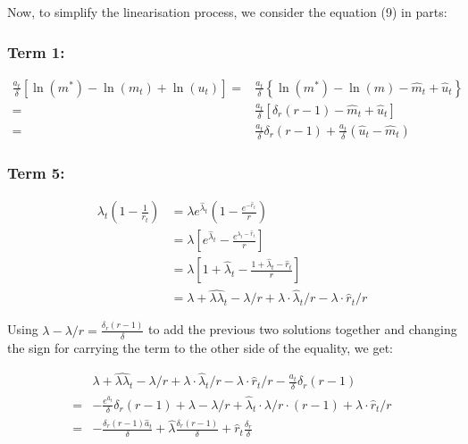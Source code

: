 \documentclass[11pt,preprint, authoryear]{elsarticle}
\numberwithin{equation}{section}
\numberwithin{figure}{section}
\numberwithin{table}{section}
\begin{document}
Now, to simplify the linearisation process, we consider the equation (9)
in parts:

\hypertarget{term-1-1}{%
\subsubsection{Term 1:}\label{term-1-1}}

\[\begin{aligned}
\frac{a_{t}}{\delta}\left[\ln \left(m^{*}\right)-\ln \left(m_{t}\right)+\ln \left(u_{t}\right)\right]
= &\frac{a_{t}}{\delta}\left\{\ln \left(m^{*}\right)-\ln (m)-\hat{m}_{t}+\hat{u}_{t}\right\} \\
= &\frac{a_{t}}{\delta}\left[\delta_{r}(r-1)-\hat{m}_{t}+\hat{u}_{t}\right] \\
= &\frac{a_{t}}{\delta}\delta_{r}(r-1) + \frac{a_{t}}{\delta} \left( \hat{u}_{t}-\hat{m}_{t} \right)
\end{aligned}\]

\hypertarget{term-5}{%
\subsubsection{Term 5:}\label{term-5}}

\[\begin{aligned} \lambda_{t}\left(1-\frac{1}{r_{t}}\right) 
&=\lambda e^{\hat{\lambda}_{t}}\left(1-\frac{e^{-\hat{r}_{t}}}{r}\right)\\
&=\lambda\left[e^{\hat{\lambda}_{t}}-\frac{e^{\lambda_{t}-\hat{r}_{t}}}{r}\right]\\
&=\lambda\left[1+\hat{\lambda}_{t}-\frac{1+\hat{\lambda}_{t}-\hat{r}_{t}}{r}\right]\\
&=\lambda+\hat{\lambda \lambda}_{t} - \lambda/r + \lambda \cdot \hat{\lambda}_{t}/r - \lambda \cdot \hat{r}_{t}/r \end{aligned}\]

Using \(\lambda - \lambda/r = \frac{\delta_r(r-1)}{\delta}\) to add the
previous two solutions together and changing the sign for carrying the
term to the other side of the equality, we get:

\[\begin{aligned}&\lambda+\hat{\lambda \lambda}_{t} - \lambda/r + \lambda \cdot \hat{\lambda}_{t}/r - \lambda \cdot \hat{r}_{t}/r -\frac{a_{t}}{\delta}\delta_{r}(r-1)\\
= &-\frac{e^{\hat{a}_{t}}}{\delta}\delta_{r}(r-1) + \lambda-\lambda/r+\hat{\lambda}_t \cdot \lambda/r \cdot (r-1) + \lambda \cdot \hat{r}_t/r\\
=& -\frac{\delta_r(r-1) \hat{a}_t}{\delta} + \hat{\lambda}\frac{\delta_r (r-1)}{\delta} +\hat{r}_t \frac{\delta_r}{\delta}
\end{aligned}\]
\end{document}
